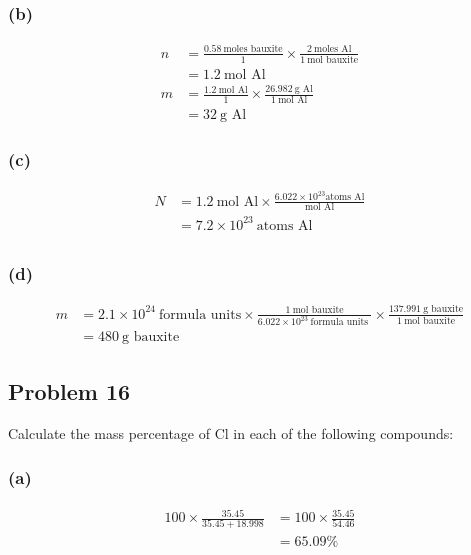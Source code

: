 \documentclass[11pt]{scrartcl}
\begin{document}
\subsubsection{(b)}

\begin{align*}
    n &= \frac{0.58\ \text{moles bauxite}}{1} \times \frac{2\ \text{moles Al}}{1\ \text{mol bauxite}} \\
    &= 1.2\ \text{mol Al} \\
    m &= \frac{1.2\ \text{mol Al}}{1} \times \frac{26.982\ \text{g Al}}{1\ \text{mol Al}} \\
    &= \boxed{32\ \text{g Al}}
\end{align*}

\subsubsection{(c)}

\begin{align*}
    N &= 1.2\ \text{mol Al} \times \frac{6.022 \times 10^{23} \text{atoms Al}}{\text{mol Al}} \\
    &= \boxed{7.2 \times 10^{23}\ \text{atoms Al}} \\
\end{align*}

\subsubsection{(d)}

\begin{align*}
    m &= 2.1 \times 10^{24}\ \text{formula units} \times \frac{1\ \text{mol bauxite}}{6.022 \times 10^{23}\ \text{formula units }} \times \frac{137.991\ \text{g bauxite}}{1\ \text{mol bauxite}} \\
    &= \boxed{480\ \text{g bauxite}}
\end{align*}

\newpage
\subsection{Problem 16}
Calculate the mass percentage of Cl in each of the following compounds:

\subsubsection{(a)}

\begin{align*}
    100 \times \frac{35.45}{35.45 + 18.998} &= 100 \times \frac{35.45}{54.46} \\
    &= \boxed{65.09\%} \\
\end{align*}
\end{document}
